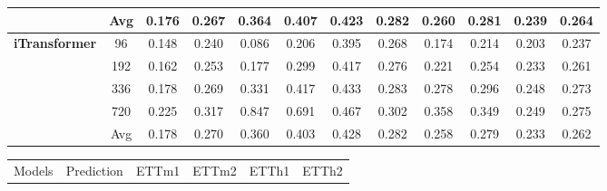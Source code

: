 \documentclass[twoside,12pt]{article}
\begin{document}
\begin{table}[htbp]
{\begin{small}
\begin{tabular}{c|c|cc|cc|cc|cc|cc}
        \cmidrule(lr){2-12}
                                                                 & Avg        & 0.176                    & 0.267                         & 0.364                        & 0.407                        & 0.423                            & 0.282 & 0.260 & 0.281 & 0.239 & 0.264 \\
        \midrule
        \multirow{5}{*}{\textbf{iTransformer}}                   & 96         & 0.148                    & 0.240                         & 0.086                        & 0.206                        & 0.395                            & 0.268 & 0.174 & 0.214 & 0.203 & 0.237 \\
                                                                 & 192        & 0.162                    & 0.253                         & 0.177                        & 0.299                        & 0.417                            & 0.276 & 0.221 & 0.254 & 0.233 & 0.261 \\
                                                                 & 336        & 0.178                    & 0.269                         & 0.331                        & 0.417                        & 0.433                            & 0.283 & 0.278 & 0.296 & 0.248 & 0.273 \\
                                                                 & 720        & 0.225                    & 0.317                         & 0.847                        & 0.691                        & 0.467                            & 0.302 & 0.358 & 0.349 & 0.249 & 0.275 \\
        \cmidrule(lr){2-12}
                                                                 & Avg        & 0.178                    & 0.270                         & 0.360                        & 0.403                        & 0.428                            & 0.282 & 0.258 & 0.279 & 0.233 & 0.262 \\
        \bottomrule
      \end{tabular}
    \end{small}
  }
  \resizebox{0.9\textwidth}{!}
  {
    \begin{small}
      \renewcommand{\multirowsetup}{\centering}
      \setlength{\tabcolsep}{5.3pt}
      \begin{tabular}{c|c|cc|cc|cc|cc}
        \toprule
        \multirow{2}{*}{Models}                                  & Prediction & \multicolumn{2}{c|}{ETTm1} & \multicolumn{2}{c|}{ETTm2} & \multicolumn{2}{c|}{ETTh1} & \multicolumn{2}{c|}{ETTh2}                                 \\

\end{tabular}
\end{small}}
\end{table}
\end{document}
